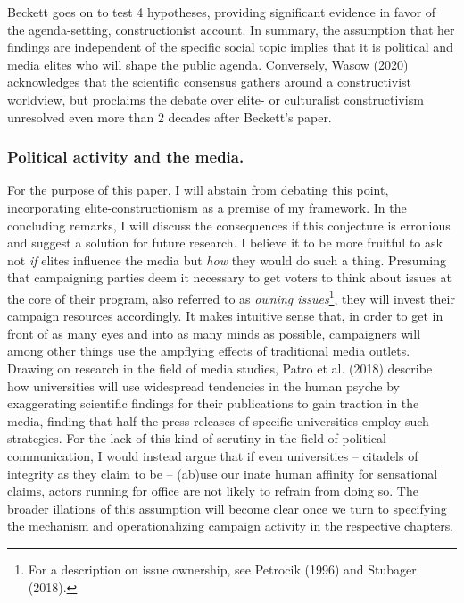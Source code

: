 \documentclass[11pt,a4paper]{article}
\begin{document}
Beckett goes on to test 4 hypotheses, providing significant evidence in favor of the agenda-setting, constructionist account. In summary, the assumption that her findings are independent of the specific social topic implies that it is political and media elites who will shape the public agenda. Conversely, Wasow (2020) acknowledges that the scientific consensus gathers around a constructivist worldview, but proclaims the debate over elite- or culturalist constructivism unresolved even more than 2 decades after Beckett’s paper.

\subsubsection{Political activity and the media.}
For the purpose of this paper, I will abstain from debating this point, incorporating elite-constructionism as a premise of my framework. In the concluding remarks, I will discuss the consequences if this conjecture is erronious and suggest a solution for future research. I believe it to be more fruitful to ask not \textit{if} elites influence the media but \textit{how} they would do such a thing. Presuming that campaigning parties deem it necessary to get voters to think about issues at the core of their program, also referred to as \textit{owning issues}\footnote{For a description on issue ownership, see Petrocik (1996) and Stubager (2018).}, they will invest their campaign resources accordingly. It makes intuitive sense that, in order to get in front of as many eyes and into as many minds as possible, campaigners will among other things use the ampflying effects of traditional media outlets. Drawing on research in the field of media studies, Patro et al. (2018) describe how universities will use widespread tendencies in the human psyche by exaggerating scientific findings for their publications to gain traction in the media, finding that half the press releases of specific universities employ such strategies. For the lack of this kind of scrutiny in the field of political communication, I would instead argue that if even universities – citadels of integrity as they claim to be – (ab)use our inate human affinity for sensational claims, actors running for office are not likely to refrain from doing so. The broader illations of this assumption will become clear once we turn to specifying the mechanism and operationalizing campaign activity in the respective chapters.
\end{document}
